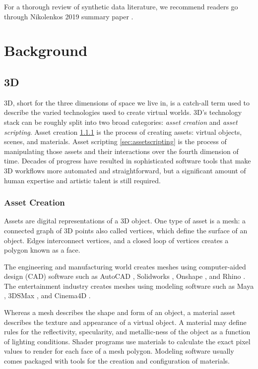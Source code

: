 \documentclass{article}
\begin{document}
For a thorough review of synthetic data literature, we recommend readers go through Nikolenkos 2019 summary paper \cite{nikolenko2019synthetic}.

\section{Background}
\label{sec:background}

\subsection{3D}
\label{sec:3d}

3D, short for the three dimensions of space we live in, is a catch-all term used to describe the varied technologies used to create virtual worlds. 3D’s technology stack can be roughly split into two broad categories: \emph{asset creation} and \emph{asset scripting}. Asset creation \ref{sec:assetcreation} is the process of creating assets: virtual objects, scenes, and materials. Asset scripting \ref{sec:assetscripting} is the process of manipulating those assets and their interactions over the fourth dimension of time. Decades of progress have resulted in sophisticated software tools that make 3D workflows more automated and straightforward, but a significant amount of human expertise and artistic talent is still required.

\subsubsection{Asset Creation}
\label{sec:assetcreation}

Assets are digital representations of a 3D object. One type of asset is a mesh: a connected graph of 3D points also called vertices, which define the surface of an object. Edges interconnect vertices, and a closed loop of vertices creates a polygon known as a face.

The engineering and manufacturing world creates meshes using computer-aided design (CAD) software such as AutoCAD \cite{autocad}, Solidworks \cite{solidworks}, Onshape \cite{onshape}, and Rhino \cite{rhino}. The entertainment industry creates meshes using modeling software such as Maya \cite{maya}, 3DSMax \cite{3dsmax}, and Cinema4D \cite{cinema4d}.

Whereas a mesh describes the shape and form of an object, a material asset describes the texture and appearance of a virtual object. A material may define rules for the reflectivity, specularity, and metallic-ness of the object as a function of lighting conditions. Shader programs use materials to calculate the exact pixel values to render for each face of a mesh polygon. Modeling software usually comes packaged with tools for the creation and configuration of materials.
\end{document}

